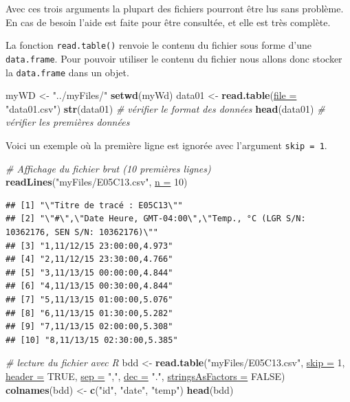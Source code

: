 \documentclass[twoside,symmetric]{book}
\newenvironment{Shaded}{}{}
\newcommand{\CommentTok}[1]{\textit{#1}}
\newcommand{\DataTypeTok}[1]{\underline{#1}}
\newcommand{\DecValTok}[1]{#1}
\newcommand{\KeywordTok}[1]{\textbf{#1}}
\newcommand{\NormalTok}[1]{#1}
\newcommand{\OtherTok}[1]{#1}
\newcommand{\StringTok}[1]{#1}
\begin{document}
Avec ces trois arguments la plupart des fichiers pourront être lus sans problème. En cas de besoin l'aide est faite pour être consultée, et elle est très complète.

La fonction \texttt{read.table()} renvoie le contenu du fichier sous forme d'une \texttt{data.frame}. Pour pouvoir utiliser le contenu du fichier nous allons donc stocker la \texttt{data.frame} dans un objet.

\begin{Shaded}
\begin{Highlighting}[]
\NormalTok{myWD <-}\StringTok{ "../myFiles/"}
\KeywordTok{setwd}\NormalTok{(myWd)}
\NormalTok{data01 <-}\StringTok{ }\KeywordTok{read.table}\NormalTok{(}\DataTypeTok{file =} \StringTok{"data01.csv"}\NormalTok{)}
\KeywordTok{str}\NormalTok{(data01) }\CommentTok{# vérifier le format des données}
\KeywordTok{head}\NormalTok{(data01) }\CommentTok{# vérifier les premières données}
\end{Highlighting}
\end{Shaded}

Voici un exemple où la première ligne est ignorée avec l'argument \texttt{skip\ =\ 1}.

\begin{Shaded}
\begin{Highlighting}[]
\CommentTok{# Affichage du fichier brut (10 premières lignes)}
\KeywordTok{readLines}\NormalTok{(}\StringTok{"myFiles/E05C13.csv"}\NormalTok{, }\DataTypeTok{n =} \DecValTok{10}\NormalTok{)}
\end{Highlighting}
\end{Shaded}

\begin{verbatim}
## [1] "\"Titre de tracé : E05C13\""
## [2] "\"#\",\"Date Heure, GMT-04:00\",\"Temp., °C (LGR S/N:
10362176, SEN S/N: 10362176)\""
## [3] "1,11/12/15 23:00:00,4.973"
## [4] "2,11/12/15 23:30:00,4.766"
## [5] "3,11/13/15 00:00:00,4.844"
## [6] "4,11/13/15 00:30:00,4.844"
## [7] "5,11/13/15 01:00:00,5.076"
## [8] "6,11/13/15 01:30:00,5.282"
## [9] "7,11/13/15 02:00:00,5.308"
## [10] "8,11/13/15 02:30:00,5.385"
\end{verbatim}

\begin{Shaded}
\begin{Highlighting}[]
\CommentTok{# lecture du fichier avec R}
\NormalTok{bdd <-}\StringTok{ }\KeywordTok{read.table}\NormalTok{(}\StringTok{"myFiles/E05C13.csv"}\NormalTok{, }\DataTypeTok{skip =} \DecValTok{1}\NormalTok{, }\DataTypeTok{header =} \OtherTok{TRUE}\NormalTok{, }
  \DataTypeTok{sep =} \StringTok{","}\NormalTok{, }\DataTypeTok{dec =} \StringTok{"."}\NormalTok{, }\DataTypeTok{stringsAsFactors =} \OtherTok{FALSE}\NormalTok{)}
\KeywordTok{colnames}\NormalTok{(bdd) <-}\StringTok{ }\KeywordTok{c}\NormalTok{(}\StringTok{"id"}\NormalTok{, }\StringTok{"date"}\NormalTok{, }\StringTok{"temp"}\NormalTok{)}
\KeywordTok{head}\NormalTok{(bdd)}
\end{Highlighting}
\end{Shaded}
\end{document}
